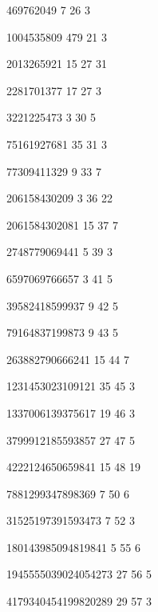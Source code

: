 \documentclass[UTF8,twoside]{ctexart}
\begin{document}
469762049   7   26  3

1004535809  479 21  3

2013265921  15  27  31

2281701377  17  27  3

3221225473  3   30  5

75161927681 35  31  3

77309411329 9   33  7

206158430209    3   36  22

2061584302081   15  37  7

2748779069441   5   39  3

6597069766657   3   41  5

39582418599937  9   42  5

79164837199873  9   43  5

263882790666241 15  44  7

1231453023109121    35  45  3

1337006139375617    19  46  3

3799912185593857    27  47  5

4222124650659841    15  48  19

7881299347898369    7   50  6

31525197391593473   7   52  3

180143985094819841  5   55  6

1945555039024054273 27  56  5

4179340454199820289 29  57  3
\end{document}
